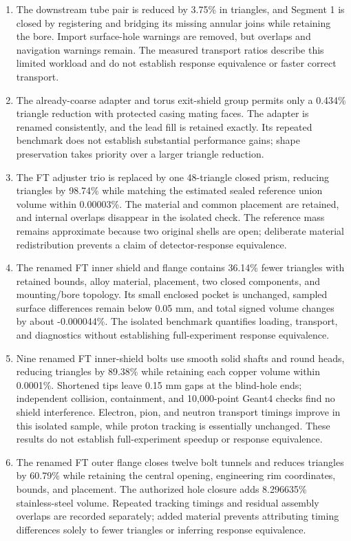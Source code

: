 \begin{enumerate}
\item The downstream tube pair is reduced by 3.75\% in triangles, and Segment 1 is closed by registering and
bridging its missing annular joins while retaining the bore. Import surface-hole warnings are removed, but
overlaps and navigation warnings remain. The measured transport ratios describe this limited workload and do
not establish response equivalence or faster correct transport.

\item The already-coarse adapter and torus exit-shield group permits only a 0.434\% triangle reduction with
protected casing mating faces. The adapter is renamed consistently, and the lead fill is retained exactly.
Its repeated benchmark does not establish substantial performance gains; shape preservation takes priority
over a larger triangle reduction.

\item The FT adjuster trio is replaced by one 48-triangle closed prism, reducing triangles by 98.74\% while
matching the estimated sealed reference union volume within 0.00003\%. The material and common placement are
retained, and internal overlaps disappear in the isolated check. The reference mass remains approximate
because two original shells are open; deliberate material redistribution prevents a claim of
detector-response equivalence.

\item The renamed FT inner shield and flange contains 36.14\% fewer triangles with retained bounds, alloy
material, placement, two closed components, and mounting/bore topology. Its small enclosed pocket is
unchanged, sampled surface differences remain below 0.05 mm, and total signed volume changes by about
-0.000044\%. The isolated benchmark quantifies loading, transport, and diagnostics without establishing
full-experiment response equivalence.

\item Nine renamed FT inner-shield bolts use smooth solid shafts and round heads, reducing triangles by 89.38\%
while retaining each copper volume within 0.0001\%. Shortened tips leave 0.15 mm gaps at the blind-hole
ends; independent collision, containment, and 10,000-point Geant4 checks find no shield interference.
Electron, pion, and neutron transport timings improve in this isolated sample, while proton tracking is
essentially unchanged. These results do not establish full-experiment speedup or response equivalence.

\item The renamed FT outer flange closes twelve bolt tunnels and reduces triangles by 60.79\% while retaining
the
central opening, engineering rim coordinates, bounds, and placement. The authorized hole closure adds
8.296635\% stainless-steel volume. Repeated tracking timings and residual assembly overlaps are recorded
separately; added material prevents attributing timing differences solely to fewer triangles or inferring
response equivalence.


\end{enumerate}

